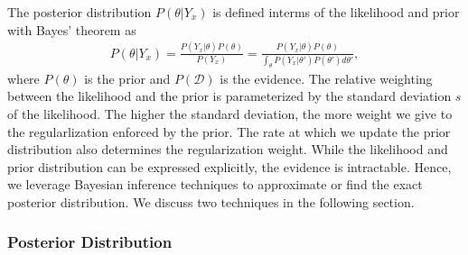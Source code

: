 The posterior distribution $P(\theta | Y_x)$ is defined interms of the likelihood and prior with Bayes' theorem as 
\begin{align}
  P(\theta | Y_x) = \frac{P(Y_x | \theta) P(\theta) }{P(Y_x)}
  = \frac{P(Y_x | \theta) P(\theta) }{\int_\theta P(Y_x | \theta') P(\theta')  d\theta'},
\end{align}
where  $P(\theta)$ is the prior and $P(\mathcal{D})$ is the evidence.
%
The relative weighting between the likelihood and the prior is parameterized by the standard deviation $s$ of the likelihood. The higher the standard deviation, 
the more weight we give to the regularlization enforced by the prior.
%
The rate at which we update the prior distribution also determines the regularization weight.
%
While the likelihood and prior distribution
can be expressed explicitly, the evidence is intractable. Hence, we leverage Bayesian inference techniques to approximate or find the exact posterior distribution.
We discuss two techniques in the following section.


\subsubsection{Posterior Distribution}

